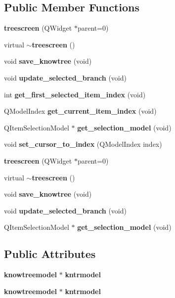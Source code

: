 \subsection*{Public Member Functions}
\begin{CompactItemize}
\item 
{\bf treescreen} (QWidget $\ast$parent=0)
\item 
virtual {\bf $\sim$treescreen} ()
\item 
void {\bf save\_\-knowtree} (void)
\item 
void {\bf update\_\-selected\_\-branch} (void)
\item 
int {\bf get\_\-first\_\-selected\_\-item\_\-index} (void)
\item 
QModel\-Index {\bf get\_\-current\_\-item\_\-index} (void)
\item 
QItem\-Selection\-Model $\ast$ {\bf get\_\-selection\_\-model} (void)
\item 
void {\bf set\_\-cursor\_\-to\_\-index} (QModel\-Index index)
\item 
{\bf treescreen} (QWidget $\ast$parent=0)
\item 
virtual {\bf $\sim$treescreen} ()
\item 
void {\bf save\_\-knowtree} (void)
\item 
void {\bf update\_\-selected\_\-branch} (void)
\item 
QItem\-Selection\-Model $\ast$ {\bf get\_\-selection\_\-model} (void)
\end{CompactItemize}
\subsection*{Public Attributes}
\begin{CompactItemize}
\item 
{\bf knowtreemodel} $\ast$ {\bf kntrmodel}
\item 
{\bf knowtreemodel} $\ast$ {\bf kntrmodel}
\end{CompactItemize}
